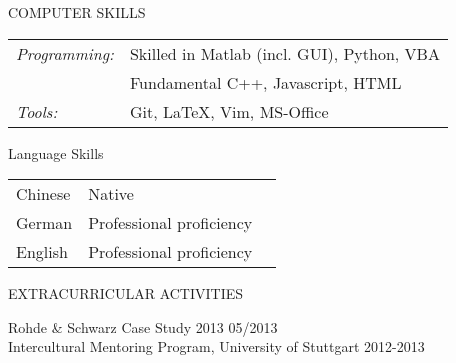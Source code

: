 \documentclass{resume} %
\begin{document}
\begin{rSection}{COMPUTER SKILLS}
\begin{tabular}{l l}
{\sl Programming:} &Skilled in Matlab (incl. GUI), Python, VBA \\&Fundamental C++, Javascript, HTML \\
{\sl Tools:} & Git, \LaTeX{}, Vim, MS-Office
\end{tabular}

\end{rSection}

\begin{rSection}{Language Skills}
\begin{tabular}{l l l}
Chinese & Native  \\
German  & Professional proficiency \\
English & Professional proficiency
\end{tabular}
\end{rSection}




\begin{rSection}{EXTRACURRICULAR  ACTIVITIES}

Rohde \& Schwarz Case Study 2013 \hfill 05/2013 \\
Intercultural Mentoring Program, University of Stuttgart \hfill 2012-2013 \\
\end{rSection}

% 
% 
\end{document}
